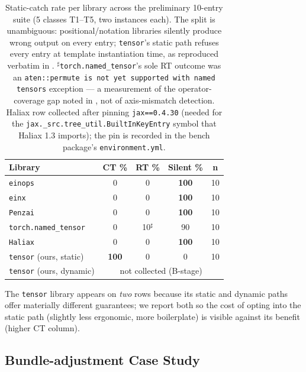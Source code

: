 \documentclass[10pt,twocolumn]{article}
\newcommand{\code}[1]{\texttt{#1}}
\begin{document}
\begin{table}[t]
\centering\small
\begin{tabular}{@{}l cccc@{}}
\toprule
\textbf{Library} & \textbf{CT \%} & \textbf{RT \%} & \textbf{Silent \%} & \textbf{n} \\
\midrule
\code{einops}~\cite{rogozhnikov2022einops}         & 0 & 0 & \textbf{100} & 10 \\
\code{einx}~\cite{flick2026einx}                   & 0 & 0 & \textbf{100} & 10 \\
\code{Penzai}~\cite{penzai}                        & 0 & 0 & \textbf{100} & 10 \\
\code{torch.named\_tensor}~\cite{pytorch-named-tensors,paszke2019pytorch}
                                                   & 0 & 10$^\sharp$ & 90 & 10 \\
\code{Haliax}~\cite{haliax}                        & 0 & 0 & \textbf{100} & 10 \\
\code{tensor} (ours, static)                       & \textbf{100} & 0 & 0 & 10 \\
\code{tensor} (ours, dynamic)                      & \multicolumn{4}{c}{not collected (B-stage)} \\
\bottomrule
\end{tabular}
\caption{Static-catch rate per library across the preliminary
10-entry suite (5 classes T1--T5, two instances each). The split is
unambiguous: positional/notation libraries silently produce wrong
output on every entry; \code{tensor}'s static path refuses every
entry at template instantiation time, as reproduced verbatim in
.
$^\sharp$\code{torch.named\_tensor}'s sole RT outcome was an
\code{aten::permute is not yet supported with named tensors}
exception --- a measurement of the operator-coverage gap noted in
\cite{pytorch-named-tensors}, not of axis-mismatch detection.
Haliax row collected after pinning \code{jax==0.4.30} (needed for
the \code{jax.\_src.tree\_util.BuiltInKeyEntry} symbol that Haliax
1.3 imports); the pin is recorded in the bench package's
\code{environment.yml}.}
\label{tab:catch-rate}
\end{table}

The \code{tensor} library appears on \emph{two} rows because its
static and dynamic paths offer materially different guarantees; we
report both so the cost of opting into the static path (slightly
less ergonomic, more boilerplate) is visible against its benefit
(higher CT column).

\subsection{Bundle-adjustment Case Study}
\label{sec:eval-ba}
\end{document}
